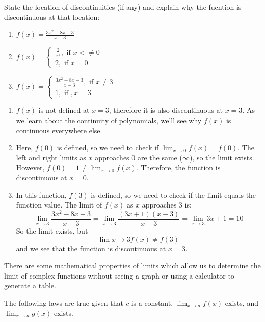 \begin{Exercise}[title=Limits Practice 5, label=limits5]
State the location of discontinuities (if any) and explain why the fucntion is discontinuous at that location:
    \begin{enumerate}
    \item $f(x) = \frac{3x^2-8x-3}{x-3}$
    \item $f(x) = \begin{cases}
    \frac{2}{x^4}, \text{ if } x <\neq 0\\
    2, \text{ if } x=0
    \end{cases}$
    \item $f(x) = \begin{cases}
        \frac{3x^2-8x-3}{x-3}, \text{ if } x \neq 3\\
        1, \text{ if }, x=3
    \end{cases}$
\end{enumerate}
\end{Exercise}
\begin{Answer}[ref=limits5]
    \begin{enumerate}
    \item $f(x)$ is not defined at $x = 3$, therefore it is also discontinuous at $x = 3$. As we learn about the continuity of polynomials, we'll see why $f(x)$ is continuous everywhere else. 
    \item Here, $f(0)$ is defined, so we need to check if $\lim_{x \to 0}f(x) = f(0)$. The left and right limits as $x$ approaches $0$ are the same ($\infty$), so the limit exists. However, $f(0) = 1 \neq \lim_{x\to 0}f(x)$. Therefore, the function is discontinuous at $x=0$.
    \item In this function, $f(3)$ is defined, so we need to check if the limit equals the function value. The limit of $f(x)$ as $x$ approaches $3$ is: $$\lim_{x \to 3}\frac{3x^2-8x-3}{x-3} = \lim_{x \to 3}\frac{(3x+1)(x-3)}{x-3} = \lim_{x \to 3}3x+1 = 10$$ So the limit exists, but $$\lim{x \to 3}f(x) \neq f(3)$$ and we see that the function is discontinuous at $x=3$.
\end{enumerate}
\end{Answer}

There are some mathematical properties of limits which allow us to determine the limit of complex functions without seeing a graph or using a calculator to generate a table. 

The following laws are true given that \textit{c} is a constant, $\lim_{x\to a} f(x) $ exists, and $\lim_{x\to a} g(x) $ exists.

